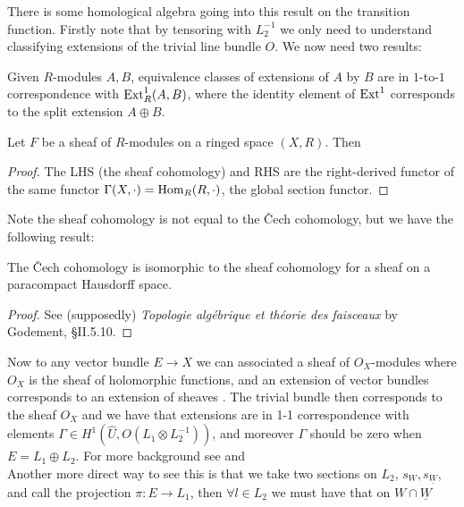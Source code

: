 \documentclass{article}
\begin{document}
\begin{remark}
	There is some homological algebra going into this result on the transition function. Firstly note that by tensoring with $L_2^{-1}$ we only need to understand classifying extensions of the trivial line bundle $O$. We now need two results:
	\begin{lemma}
		Given $R$-modules $A,B$, equivalence classes of extensions of $A$ by $B$ are in $1$-to-$1$ correspondence with $\operatorname{Ext}^1_R(A,B)$, where the identity element of $\operatorname{Ext}^1$ corresponds to the split extension $A \oplus B$. 
	\end{lemma}
	\begin{lemma}
		Let $F$ be a sheaf of $R$-modules on a ringed space $(X,R)$. Then 
	\end{lemma}
\begin{proof}
	The LHS (the sheaf cohomology) and RHS are the right-derived functor of the same functor $\Gamma(X,\cdot) = \operatorname{Hom}_R(R,\cdot)$, the global section functor.
\end{proof}
\begin{remark}
	Note the sheaf cohomology is not equal to the \v{C}ech cohomology, but we have the following result:
\end{remark}
\begin{lemma}
	The \v{C}ech cohomology is isomorphic to the sheaf cohomology for a sheaf on a paracompact Hausdorff space. 
\end{lemma}
\begin{proof}
	See (supposedly) \emph{Topologie algébrique et théorie des faisceaux} by Godement, \S II.5.10. 
\end{proof}
Now to any vector bundle $E \to X$ we can associated a sheaf of $O_X$-modules where $O_X$ is the sheaf of holomorphic functions, and an extension of vector bundles corresponds to an extension of sheaves \cite{Atiyah1957}. The trivial bundle then corresponds to the sheaf $O_X$ and we have that extensions
are in 1-1 correspondence with elements $\Gamma \in H^1(\hat{U},O(L_1\otimes L_2^{-1}))$, and moreover $\Gamma$ should be zero when $E = L_1 \oplus L_2$. For more background see \cite{Atiyah1957a} and \cite{Grothendieck1955} \\
Another more direct way to see this is that we take two sections on $L_2$, $s_W, s_{\underline{W}}$, and call the projection $\pi:E \to L_1$, then $\forall l \in L_2$ we must have that on $W \cap \underline{W}$
\end{remark}
\end{document}
